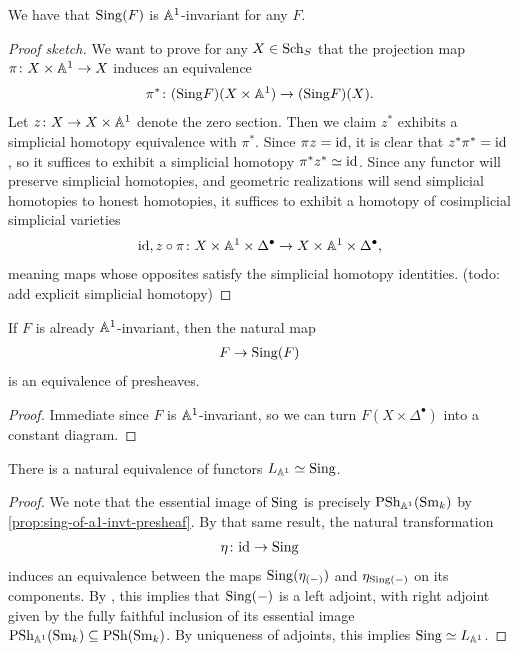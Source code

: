 \documentclass[11pt]{amsart}
\renewcommand{\Pre}{\mathrm{PSh}}
\begin{document}
\begin{proposition} We have that $\mathrm{Sing}(F)$ is $\mathbb{A}^1$-invariant for any $F$.
\end{proposition}
\begin{proof}[Proof sketch]
We want to prove for any $X\in \mathrm{Sch}_S$ that the projection map $\pi \colon X \times \mathbb{A}^1 \to X$ induces an equivalence
\begin{align*}
    \pi^\ast \colon (\mathrm{Sing} F)(X \times \mathbb{A}^1) \to (\mathrm{Sing} F)(X).
\end{align*}
%
Let $z \colon X \to X \times \mathbb{A}^1$ denote the zero section. Then we claim $z^\ast$ exhibits a simplicial homotopy equivalence with $\pi^\ast$. Since $\pi z = \mathrm{id}$, it is clear that $z^\ast \pi^\ast = \mathrm{id}$, so it suffices to exhibit a simplicial homotopy $\pi^\ast z^\ast \simeq \mathrm{id}$. Since any functor will preserve simplicial homotopies, and geometric realizations will send simplicial homotopies to honest homotopies, it suffices to exhibit a homotopy of cosimplicial simplicial varieties
\begin{align*}
    \mathrm{id}, z\circ \pi \colon X \times \mathbb{A}^1 \times \Delta^\bullet \to X \times \mathbb{A}^1 \times \Delta^\bullet,
\end{align*}
meaning maps whose opposites satisfy the simplicial homotopy identities. (todo: add explicit simplicial homotopy)
\end{proof}

\begin{proposition}\label{prop:sing-of-a1-invt-presheaf} 
If $F$ is already $\mathbb{A}^1$-invariant, then the natural map
\begin{align*}
    F \to \mathrm{Sing}(F)
\end{align*}
is an equivalence of presheaves.
\end{proposition}
\begin{proof} Immediate since $F$ is $\mathbb{A}^1$-invariant, so we can turn $F(X \times \Delta^\bullet)$ into a constant diagram.
\end{proof}

\begin{proposition} There is a natural equivalence of functors $L_{\mathbb{A}^1} \simeq \mathrm{Sing}$.
\end{proposition}
\begin{proof}
We note that the essential image of $\mathrm{Sing}$ is precisely $\Pre_{\A^1}(\Sm_k)$ by \autoref{prop:sing-of-a1-invt-presheaf}. By that same result, the natural transformation
\begin{align*}
    \eta \colon \mathrm{id} \to \mathrm{Sing}
\end{align*}
induces an equivalence between the maps $\mathrm{Sing}(\eta_{(-)})$ and $\eta_{\mathrm{Sing}(-)}$ on its components. By \cite[5.2.7.4]{HTT}, this implies that $\mathrm{Sing}(-)$ is a left adjoint, with right adjoint given by the fully faithful inclusion of its essential image $\Pre_{\A^1}(\Sm_k) \subseteq \Pre(\Sm_k)$. By uniqueness of adjoints, this implies $\mathrm{Sing} \simeq L_{\mathbb{A}^1}$.
\end{proof}
\end{document}
